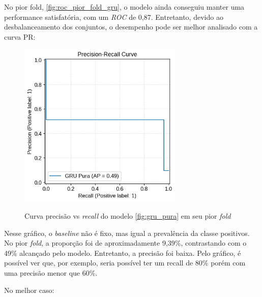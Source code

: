 No pior fold, \ref{fig:roc_pior_fold_gru}, o modelo ainda conseguiu manter uma performance satisfatória, com um \textit{ROC} de 0,87. 
Entretanto, devido ao desbalanceamento dos conjuntos, o desempenho pode ser melhor analisado com a curva PR:

\begin{figure}[H]
  \centering
  \caption{Curva precisão vs \textit{recall} do modelo \ref{fig:gru_pura} em seu pior \textit{fold}}
   \includegraphics[width=0.7\textwidth]{figuras/modelos_resultados/gru/ap_gru_pior_fold.png} %
  \label{fig:ap_gru_pior_fold}
\end{figure}

Nesse gráfico, o \textit{baseline} não é fixo, mas igual a prevalência da classe positivos. No pior \textit{fold}, a proporção foi de aproximadamente
9,39\%, contrastando com o 49\% alcançado pelo modelo. Entretanto, a precisão foi baixa. Pelo gráfico, é possível ver que, por exemplo, seria 
possível ter um recall de 80\% porém com uma precisão menor que 60\%.

No melhor caso:

